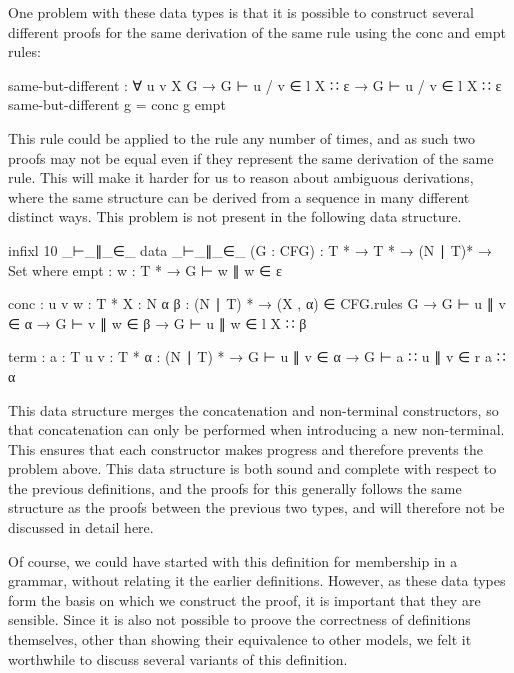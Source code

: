 	One problem with these data types is that it is possible to construct
	several different proofs for the same derivation of the same rule using the
	conc and empt rules:

	\begin{code}
		same-but-different : ∀ {u v X G} →
		  G ⊢ u / v ∈ l X ∷ ε →
		  G ⊢ u / v ∈ l X ∷ ε
		same-but-different g = conc g empt
	\end{code}

	This rule could be applied to the rule any number of times, and as such two
	proofs may not be equal even if they represent the same derivation of the
	same rule. This will make it harder for us to reason about ambiguous
	derivations, where the same structure can be derived from a sequence in
	many different distinct ways. This problem is not present in the following
	data structure.

	\begin{code}
		infixl 10 _⊢_∥_∈_
		data _⊢_∥_∈_ (G : CFG) : T * → T * → (N ∣ T)* → Set where
		  empt : {w : T *} →
		    G ⊢ w ∥ w ∈ ε

		  conc : {u v w : T *} {X : N} {α β : (N ∣ T) *} →
		    (X , α) ∈ CFG.rules G →
		    G ⊢ u ∥ v ∈ α →
		    G ⊢ v ∥ w ∈ β →
		      G ⊢ u ∥ w ∈ l X ∷ β

		  term : {a : T} {u v : T *} {α : (N ∣ T) *} →
		    G ⊢ u ∥ v ∈ α →
		      G ⊢ a ∷ u ∥ v ∈ r a ∷ α
	\end{code}
	
	This data structure merges the concatenation and non-terminal constructors,
	so that concatenation can only be performed when introducing a new
	non-terminal. This ensures that each constructor makes progress and
	therefore prevents the problem above. This data structure is both sound and
	complete with respect to the previous definitions, and the proofs for this
	generally follows the same structure as the proofs between the previous two
	types, and will therefore not be discussed in detail here.

	Of course, we could have started with this definition for membership in a 
	grammar, without relating it the earlier definitions. However, as these 
	data types form the basis on which we construct the proof, it is important 
	that they are sensible. Since it is also not possible to proove the 
	correctness of definitions themselves, other than showing their equivalence 
	to other models, we felt it worthwhile to discuss several variants of this 
	definition.
